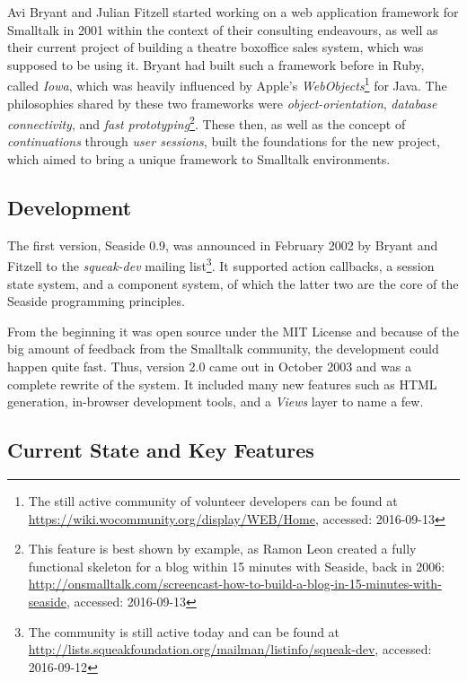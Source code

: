 \documentclass[a4paper,12pt,pagesize,headsepline,oribibl,titlepage]{scrartcl}
\begin{document}
Avi Bryant and Julian Fitzell started working on a web application framework for Smalltalk in 2001 within the context of their consulting endeavours, as well as their current project of building a theatre boxoffice sales system, which was supposed to be using it. Bryant had built such a framework before in Ruby, called \emph{Iowa}, which was heavily influenced by Apple's \emph{WebObjects}\footnote{The still active community of volunteer developers can be found at \url{https://wiki.wocommunity.org/display/WEB/Home}, accessed: 2016-09-13} for Java. The philosophies shared by these two frameworks were \emph{object-orientation}, \emph{database connectivity}, and \emph{fast prototyping}\footnote{This feature is best shown by example, as Ramon Leon created a fully functional skeleton for a blog within 15 minutes with Seaside, back in 2006: \url{http://onsmalltalk.com/screencast-how-to-build-a-blog-in-15-minutes-with-seaside}, accessed: 2016-09-13}. These then, as well as the concept of \emph{continuations} through \emph{user sessions}, built the foundations for the new project, which aimed to bring a unique framework to Smalltalk environments.


\subsection{Development}
\label{sec:dev} 

The first version, Seaside 0.9, was announced in February 2002 by Bryant and Fitzell to the \emph{squeak-dev} mailing list\footnote{The community is still active today and can be found at \url{http://lists.squeakfoundation.org/mailman/listinfo/squeak-dev}, accessed: 2016-09-12}. It supported action callbacks, a session state system, and a component system, of which the latter two are the core of the Seaside programming principles.

From the beginning it was open source under the MIT License and because of the big amount of feedback from the Smalltalk community, the development could happen quite fast. Thus, version 2.0 came out in October 2003 and was a complete rewrite of the system. It included many new features such as HTML generation, in-browser development tools, and a \emph{Views} layer to name a few. \cite{Fitzl}


\subsection{Current State and Key Features}
\label{sec:current} 
\end{document}
